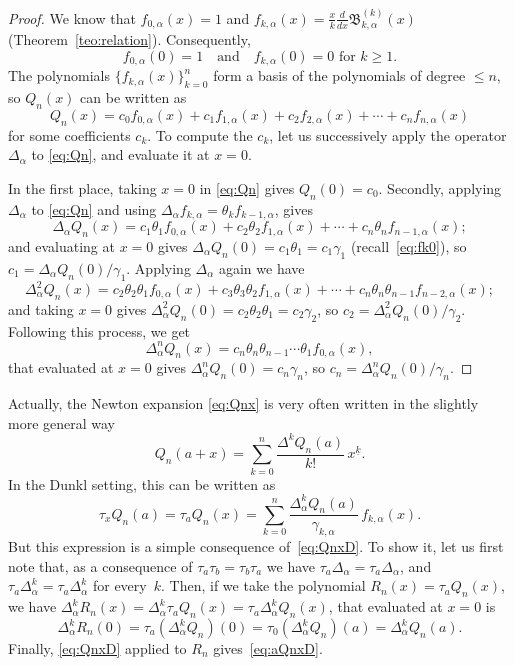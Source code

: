 \documentclass[11pt]{article}
\theoremstyle{plain}
\theoremstyle{remark}
\numberwithin{equation}{section} %
\newcommand{\B}{\mathfrak{B}}
\newcommand{\cc}{\gamma}
\begin{document}
\begin{proof}
We know that $f_{0,\alpha}(x) = 1$ and 
$f_{k,\alpha}(x) = \frac{x}{k} \frac{d}{dx}\B_{k,\alpha}^{(k)}(x)$ 
(Theorem~\ref{teo:relation}). Consequently,
\begin{equation}
\label{eq:fk0}
f_{0,\alpha}(0) = 1 \quad\text{and}\quad f_{k,\alpha}(0) = 0 \text{ for }k \ge 1.
\end{equation}
The polynomials $\{f_{k,\alpha}(x)\}_{k=0}^n$ form a basis of the polynomials of degree $\le n$, so $Q_n(x)$ can be written as
\begin{equation}
\label{eq:Qn}
Q_n(x) = c_0 f_{0,\alpha}(x) + c_1 f_{1,\alpha}(x) + c_2 f_{2,\alpha}(x) 
+ \cdots + c_n f_{n,\alpha}(x)
\end{equation}
for some coefficients $c_k$. To compute the $c_k$, let us successively apply the operator $\Delta_{\alpha}$ to \eqref{eq:Qn}, and evaluate it at $x=0$.

In the first place, taking $x=0$ in \eqref{eq:Qn} gives $Q_n(0)=c_0$.
Secondly, applying $\Delta_{\alpha}$ to \eqref{eq:Qn} 
and using $\Delta_{\alpha}f_{k,\alpha} =  \theta_k f_{k-1,\alpha}$, gives
\[
\Delta_{\alpha} Q_n(x) = c_1 \theta_1 f_{0,\alpha}(x) + c_2 \theta_2 f_{1,\alpha}(x) 
+ \cdots + c_n \theta_n f_{n-1,\alpha}(x);
\]
and evaluating at $x=0$ gives $\Delta_{\alpha} Q_n(0) = c_1 \theta_1 = c_1 \cc_1$ (recall~\eqref{eq:fk0}), so
$c_1 = {\Delta_{\alpha}Q_n(0)}/{\cc_1}$.
Applying $\Delta_{\alpha}$ again we have
\[
\Delta_{\alpha}^2 Q_n(x) = c_2 \theta_2\theta_1 f_{0,\alpha}(x) + c_3 \theta_3\theta_2 f_{1,\alpha}(x) 
+ \cdots + c_n \theta_n\theta_{n-1} f_{n-2,\alpha}(x);
\]
and taking $x=0$ gives $\Delta_{\alpha}^2 Q_n(0) = c_2 \theta_2\theta_1 = c_2 \cc_2$, so
$c_2 = {\Delta_{\alpha}^2Q_n(0)}/{\cc_2}$.
Following this process, we get 
\[
\Delta_{\alpha}^n Q_n(x) = c_n \theta_n\theta_{n-1} \cdots \theta_1 f_{0,\alpha}(x),
\]
that evaluated at $x=0$ gives $\Delta_{\alpha}^n Q_n(0) = c_n\cc_n$, so $c_n = \Delta_{\alpha}^n Q_n(0)/\cc_n$.
\end{proof}

Actually, the Newton expansion \eqref{eq:Qnx} is very often written in the slightly more general way
\[
  Q_n(a+x) = \sum_{k=0}^n \frac{\Delta^kQ_n(a)}{k!}\, x^{\underline{k}}.
\]
In the Dunkl setting, this can be written as
\begin{equation}
\label{eq:aQnxD}
  \tau_x Q_n(a) = \tau_a Q_n(x) 
  = \sum_{k=0}^n \frac{\Delta_{\alpha}^kQ_n(a)}{\cc_{k,\alpha}}\, f_{k,\alpha}(x).
\end{equation}
But this expression is a simple consequence of~\eqref{eq:QnxD}. 
To show it, let us first note that, as a consequence of $\tau_a\tau_b = \tau_b\tau_a$ we have $\tau_a\Delta_\alpha = \tau_a\Delta_\alpha$, 
and $\tau_a\Delta_\alpha^k = \tau_a\Delta_\alpha^k$ for every~$k$.
Then, if we take the polynomial $R_n(x) = \tau_a Q_n(x)$, we have
$\Delta_\alpha^k R_n(x) = \Delta_\alpha^k \tau_a Q_n(x) = \tau_a \Delta_\alpha^k Q_n(x)$,
that evaluated at $x=0$ is
\[
\Delta_\alpha^k R_n(0) = \tau_a (\Delta_\alpha^k Q_n)(0) 
= \tau_0 (\Delta_\alpha^k Q_n)(a) = \Delta_\alpha^k Q_n(a).
\]
Finally, \eqref{eq:QnxD} applied to $R_n$ gives~\eqref{eq:aQnxD}.
\end{document}
